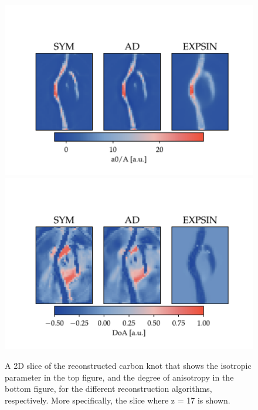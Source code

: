 \begin{figure}[h!]
    \centering

    \includegraphics[trim = {0 0 0 2.0cm}, clip, width = 1\textwidth]{./svg-inkscape/ck_slices_A_svg-tex.pdf}
    \includegraphics[trim = {0 0 0 2.0cm}, clip, width = 1\textwidth]{./svg-inkscape/ck_slices_DoA_svg-tex.pdf}

    \caption{  A 2D slice of the reconstructed carbon knot that shows the isotropic parameter in the top figure, and the degree of anisotropy in the bottom figure, for the different reconstruction algorithms, respectively.
        More specifically, the slice where z = 17 is shown. }
    \label{fig:carbon_knot_reconstruction_2D_coeffs}
\end{figure}

